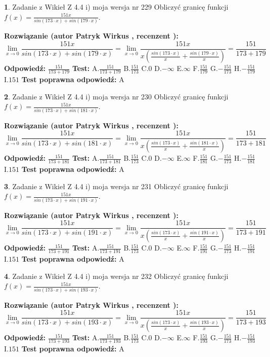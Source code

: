 \documentclass[12pt, a4paper]{article}
\theoremstyle{definition} %
\newtheorem{zad}{}
\newcommand{\zadStart}[1]{\begin{zad}#1\newline}
\newcommand{\zadStop}{\end{zad}}
\newcommand{\rozwStart}[2]{\noindent \textbf{Rozwiązanie (autor #1 , recenzent #2): }\newline}
\newcommand{\rozwStop}{\newline}
\newcommand{\odpStart}{\noindent \textbf{Odpowiedź:}\newline}
\newcommand{\odpStop}{\newline}
\newcommand{\testStart}{\noindent \textbf{Test:}\newline}
\newcommand{\testStop}{\newline}
\newcommand{\kluczStart}{\noindent \textbf{Test poprawna odpowiedź:}\newline}
\newcommand{\kluczStop}{\newline}
\begin{document}
\zadStart{Zadanie z Wikieł Z 4.4 i) moja wersja nr 229}
Obliczyć granicę funkcji $f(x)=\frac{151x}{sin(173\cdot x) +sin(179\cdot x)}$.
\zadStop
\rozwStart{Patryk Wirkus}{}
$$\lim\limits_{x\to 0}\frac{151x}{sin(173\cdot x) +sin(179\cdot x)}=\lim\limits_{x\to 0}\frac{151x}{x(\frac{sin(173\cdot x)}{x}+\frac{sin(179\cdot x)}{x})}=\frac{151}{173+179}$$
\rozwStop
\odpStart
$\frac{151}{173+179}$
\odpStop
\testStart
A.$\frac{151}{173+179}$
B.$\frac{151}{173}$
C.$0$
D.$-\infty$
E.$\infty$
F.$\frac{151}{179}$
G.$-\frac{151}{173}$
H.$-\frac{151}{179}$
I.$151$
\testStop
\kluczStart
A
\kluczStop



\zadStart{Zadanie z Wikieł Z 4.4 i) moja wersja nr 230}
Obliczyć granicę funkcji $f(x)=\frac{151x}{sin(173\cdot x) +sin(181\cdot x)}$.
\zadStop
\rozwStart{Patryk Wirkus}{}
$$\lim\limits_{x\to 0}\frac{151x}{sin(173\cdot x) +sin(181\cdot x)}=\lim\limits_{x\to 0}\frac{151x}{x(\frac{sin(173\cdot x)}{x}+\frac{sin(181\cdot x)}{x})}=\frac{151}{173+181}$$
\rozwStop
\odpStart
$\frac{151}{173+181}$
\odpStop
\testStart
A.$\frac{151}{173+181}$
B.$\frac{151}{173}$
C.$0$
D.$-\infty$
E.$\infty$
F.$\frac{151}{181}$
G.$-\frac{151}{173}$
H.$-\frac{151}{181}$
I.$151$
\testStop
\kluczStart
A
\kluczStop



\zadStart{Zadanie z Wikieł Z 4.4 i) moja wersja nr 231}
Obliczyć granicę funkcji $f(x)=\frac{151x}{sin(173\cdot x) +sin(191\cdot x)}$.
\zadStop
\rozwStart{Patryk Wirkus}{}
$$\lim\limits_{x\to 0}\frac{151x}{sin(173\cdot x) +sin(191\cdot x)}=\lim\limits_{x\to 0}\frac{151x}{x(\frac{sin(173\cdot x)}{x}+\frac{sin(191\cdot x)}{x})}=\frac{151}{173+191}$$
\rozwStop
\odpStart
$\frac{151}{173+191}$
\odpStop
\testStart
A.$\frac{151}{173+191}$
B.$\frac{151}{173}$
C.$0$
D.$-\infty$
E.$\infty$
F.$\frac{151}{191}$
G.$-\frac{151}{173}$
H.$-\frac{151}{191}$
I.$151$
\testStop
\kluczStart
A
\kluczStop



\zadStart{Zadanie z Wikieł Z 4.4 i) moja wersja nr 232}
Obliczyć granicę funkcji $f(x)=\frac{151x}{sin(173\cdot x) +sin(193\cdot x)}$.
\zadStop
\rozwStart{Patryk Wirkus}{}
$$\lim\limits_{x\to 0}\frac{151x}{sin(173\cdot x) +sin(193\cdot x)}=\lim\limits_{x\to 0}\frac{151x}{x(\frac{sin(173\cdot x)}{x}+\frac{sin(193\cdot x)}{x})}=\frac{151}{173+193}$$
\rozwStop
\odpStart
$\frac{151}{173+193}$
\odpStop
\testStart
A.$\frac{151}{173+193}$
B.$\frac{151}{173}$
C.$0$
D.$-\infty$
E.$\infty$
F.$\frac{151}{193}$
G.$-\frac{151}{173}$
H.$-\frac{151}{193}$
I.$151$
\testStop
\kluczStart
A
\kluczStop
\end{document}

